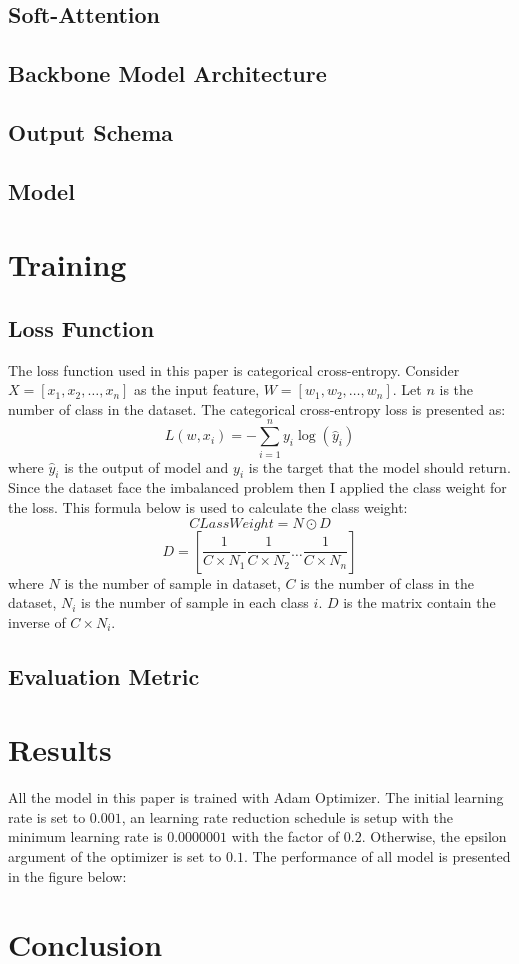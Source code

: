 \subsection{Soft-Attention}
\subsection{Backbone Model Architecture}
\subsection{Output Schema}
\subsection{Model}

\section{Training}
\subsection{Loss Function}
The loss function used in this paper is categorical cross-entropy. Consider $X = [x_1, x_2, \dots, x_n]$ as the input feature, $W = [w_1, w_2, \dots, w_n]$. Let $n$ is the number of class in the dataset. The categorical cross-entropy loss is presented as:
\[L(w, x_i) = -\sum_{i=1}^{n}y_i\log(\hat{y}_i)\]
where $\hat{y}_i$  is the output of model and $y_i$ is the target that the model should return. \\
Since the dataset face the imbalanced problem then I applied the class weight for the loss. This formula below is used to calculate the class weight:
\[CLassWeight = N \odot D\]
\[D = [\frac{1}{C \times  N_1}  \frac{1}{C \times  N_2}  \dots \frac{1}{C \times  N_n}]\]
where $N$ is the number of sample in dataset, $C$ is the number of class in the dataset, $N_i$ is the number of sample in each class $i$. $D$ is the matrix contain the inverse of $C \times N_i$.
\subsection{Evaluation Metric}

\section{Results}
All the model in this paper is trained with Adam Optimizer\cite{6980}. The initial learning rate is set to $0.001$, an learning rate reduction schedule is setup with the minimum learning rate is $0.0000001$ with the factor of $0.2$. Otherwise, the epsilon argument of the optimizer is set to $0.1$. The performance of all model is presented in the figure below:
\section{Conclusion}
\cite{08332}
\clearpage
\pagebreak
